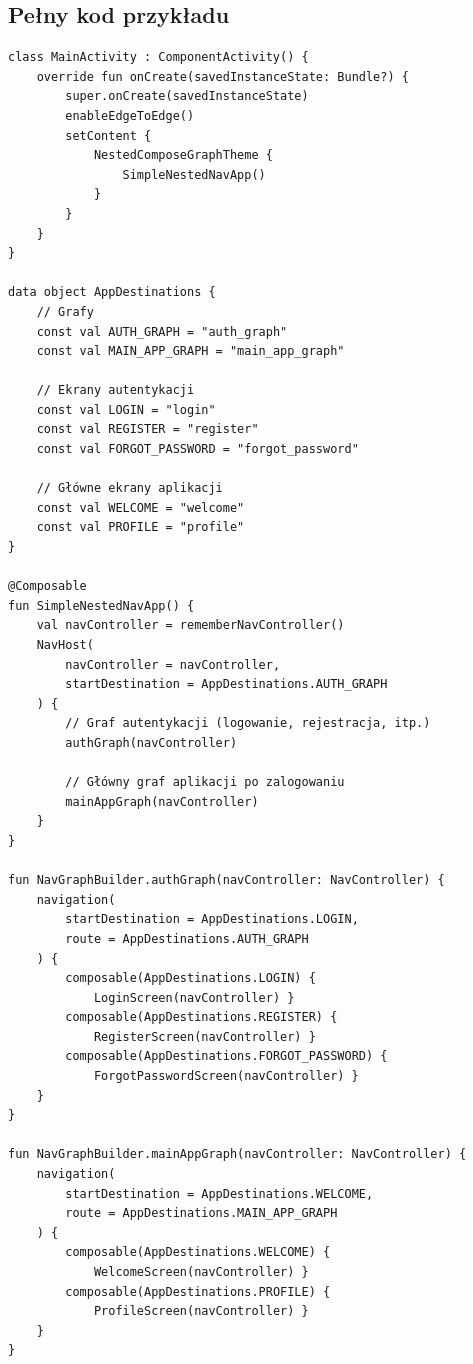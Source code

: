 \subsection{Pełny kod przykładu}

\begin{verbatim}
class MainActivity : ComponentActivity() {
    override fun onCreate(savedInstanceState: Bundle?) {
        super.onCreate(savedInstanceState)
        enableEdgeToEdge()
        setContent {
            NestedComposeGraphTheme {
                SimpleNestedNavApp()
            }
        }
    }
}

data object AppDestinations {
    // Grafy
    const val AUTH_GRAPH = "auth_graph"
    const val MAIN_APP_GRAPH = "main_app_graph"

    // Ekrany autentykacji
    const val LOGIN = "login"
    const val REGISTER = "register"
    const val FORGOT_PASSWORD = "forgot_password"

    // Główne ekrany aplikacji
    const val WELCOME = "welcome"
    const val PROFILE = "profile"
}

@Composable
fun SimpleNestedNavApp() {
    val navController = rememberNavController()
    NavHost(
        navController = navController,
        startDestination = AppDestinations.AUTH_GRAPH
    ) {
        // Graf autentykacji (logowanie, rejestracja, itp.)
        authGraph(navController)

        // Główny graf aplikacji po zalogowaniu
        mainAppGraph(navController)
    }
}

fun NavGraphBuilder.authGraph(navController: NavController) {
    navigation(
        startDestination = AppDestinations.LOGIN,
        route = AppDestinations.AUTH_GRAPH
    ) {
        composable(AppDestinations.LOGIN) {
            LoginScreen(navController) }
        composable(AppDestinations.REGISTER) {
            RegisterScreen(navController) }
        composable(AppDestinations.FORGOT_PASSWORD) {
            ForgotPasswordScreen(navController) }
    }
}

fun NavGraphBuilder.mainAppGraph(navController: NavController) {
    navigation(
        startDestination = AppDestinations.WELCOME,
        route = AppDestinations.MAIN_APP_GRAPH
    ) {
        composable(AppDestinations.WELCOME) {
            WelcomeScreen(navController) }
        composable(AppDestinations.PROFILE) {
            ProfileScreen(navController) }
    }
}


\end{verbatim}
